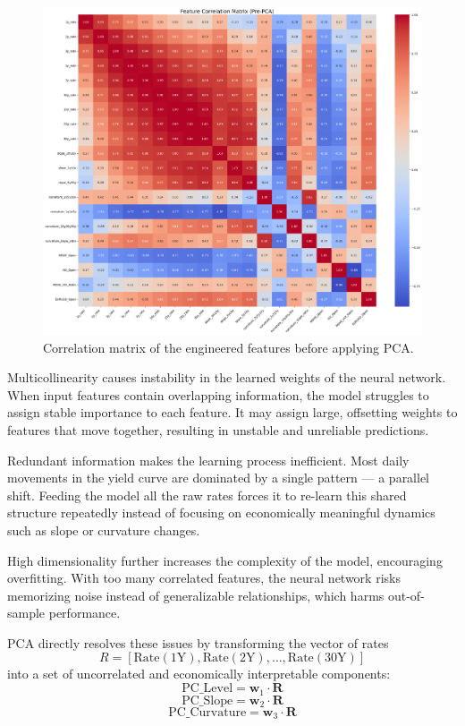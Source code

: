 {\begin{figure}[H]
	\centering
	\includegraphics[width=1\textwidth]{images/features/feature_correlation_matrixPre-PCA.png}
	\caption{Correlation matrix of the engineered features before applying PCA.}
	\label{fig:feature_correlation_prePCA}
\end{figure}

Multicollinearity causes instability in the learned weights of the neural network. When input features contain overlapping information, the model struggles to assign stable importance to each feature. It may assign large, offsetting weights to features that move together, resulting in unstable and unreliable predictions.

Redundant information makes the learning process inefficient. Most daily movements in the yield curve are dominated by a single pattern — a parallel shift. Feeding the model all the raw rates forces it to re-learn this shared structure repeatedly instead of focusing on economically meaningful dynamics such as slope or curvature changes.

High dimensionality further increases the complexity of the model, encouraging overfitting. With too many correlated features, the neural network risks memorizing noise instead of generalizable relationships, which harms out-of-sample performance.

PCA directly resolves these issues by transforming the vector of rates
\[
	R = [\text{Rate}(1\text{Y}), \text{Rate}(2\text{Y}), \dots, \text{Rate}(30\text{Y})]
\]
into a set of uncorrelated and economically interpretable components:
\begin{equation}
	\text{PC\_Level} = \mathbf{w}_1 \cdot \mathbf{R}
\end{equation}
\begin{equation}
	\text{PC\_Slope} = \mathbf{w}_2 \cdot \mathbf{R}
\end{equation}
\begin{equation}
	\text{PC\_Curvature} = \mathbf{w}_3 \cdot \mathbf{R}
\end{equation}

}
